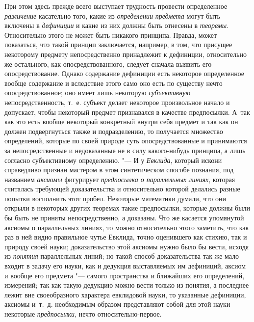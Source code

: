 При этом здесь прежде всего выступает трудность провести
определенное {\em различение}
касательно того, какие из
{\em определении
}{\em предмета} могут
быть включены в {\em дефиниции}
и какие из них должны быть отнесены в
{\em теоремы}.
Относительно этого не может быть никакого принципа. Правда,
может показаться, что такой принцип заключается, например, в том, что
присущее некоторому предмету непосредственно принадлежит к дефиниции,
относительно же остального, как опосредствованного, следует сначала выявить
его опосредствование. Однако содержание дефиниции есть некоторое
определенное вообще содержание и вследствие этого само оно есть по существу
нечто опосредствованное; оно имеет лишь некоторую
{\em субъективную}
непосредственность, т.~е. субъект делает некоторое
произвольное начало и допускает, чтобы некоторый предмет признавался в
качестве предпосылки. А~так как это есть вообще некоторый конкретный внутри
себя предмет и так как он должен подвергнуться также и подразделению, то
получается множество определений, которые по своей природе суть
опосредствованные и принимаются за непосредственные и недоказанные не в
силу какого-нибудь принципа, а лишь согласно субъективному определению. "---
И у {\em Евклида},
который искони справедливо признан мастером в этом
синтетическом способе познания, под названием
{\em аксиомы} фигурирует
{\em предпосылка о параллельных
линиях}, которая считалась требующей доказательства и
относительно которой делались разные попытки восполнить этот пробел.
Некоторые математики думали, что они открыли в некоторых других теоремах
такие предпосылки, которые должны были бы быть не приняты непосредственно,
а доказаны. Что же касается упомянутой аксиомы о параллельных линиях, то
можно относительно этого заметить, что как раз в ней видно правильное чутье
Евклида, точно оценившего как стихию, так и природу своей науки;
доказательство этой аксиомы нужно было бы вести, исходя из
{\em понятия}
параллельных линий; но такой способ доказательства так же
мало входит в задачу его науки, как и дедукция выставляемых им дефиниций,
аксиом и вообще его предмета "--- самого пространства и
ближайших его определений, измерений; так как такую дедукцию можно вести
только из понятия, а последнее лежит вне своеобразного характера евклидовой
науки, то указанные дефиниции, аксиомы и~т.~д. необходимым образом
представляют собой для этой науки некоторые
{\em предпосылки}, нечто
относительно-первое.


